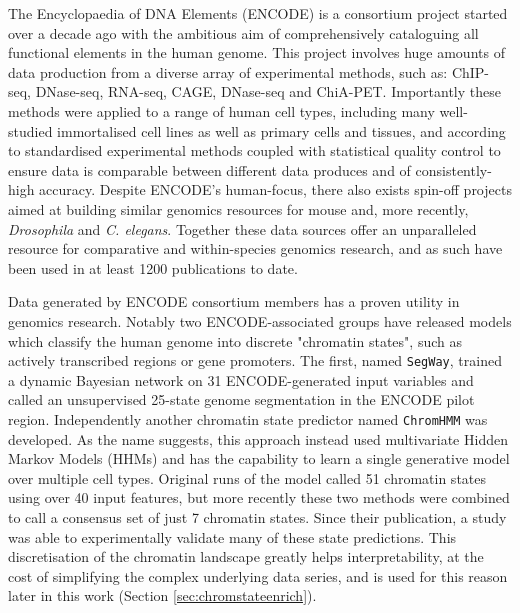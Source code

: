 \documentclass[a4paper,11pt,oneside]{book}
\begin{document}
The Encyclopaedia of DNA Elements (ENCODE) is a consortium project started over a decade ago with the ambitious aim of comprehensively cataloguing all functional elements in the human genome.\cite{Feingold2004, Qu2013, Dunham2012} This project involves huge amounts of data production from a diverse array of experimental methods, such as: ChIP-seq, DNase-seq, RNA-seq, CAGE, DNase-seq and ChiA-PET.\cite{Myers2011} Importantly these methods were applied to a range of human cell types, including many well-studied immortalised cell lines as well as primary cells and tissues, and according to standardised experimental methods\cite{Landt2012} coupled with statistical quality control\cite{Dunham2012, Boyle2014, Marinov2013} to ensure data is comparable between different data produces and of consistently-high accuracy. Despite ENCODE's human-focus, there also exists spin-off projects aimed at building similar genomics resources for mouse\cite{Yue2014} and, more recently, \emph{Drosophila} and \emph{C. elegans}.\cite{Ho2014} Together these data sources offer an unparalleled resource for comparative and within-species genomics research, and as such have been used in at least 1200 publications to date.\cite{encodenews}

Data generated by ENCODE consortium members has a proven utility in genomics research. Notably two ENCODE-associated groups have released models which classify the human genome into discrete "chromatin states", such as actively transcribed regions or gene promoters. The first, named \texttt{SegWay}, trained a dynamic Bayesian network on  31 ENCODE-generated input variables and called an unsupervised 25-state genome segmentation in the ENCODE pilot region.\cite{Hoffman2012} Independently another chromatin state predictor named \texttt{ChromHMM} was developed.\cite{Ernst2011, Ernst2012} As the name suggests, this approach instead used multivariate Hidden Markov Models (HHMs) and has the capability to learn a single generative model over multiple cell types. Original runs of the model called 51 chromatin states using over 40 input features,\cite{Ernst2010a} but more recently these two methods were combined to call a consensus set of just 7 chromatin states.\cite{Hoffman2013} Since their publication, a study was able to experimentally validate many of these state predictions.\cite{Kwasnieski2014} This discretisation of the chromatin landscape greatly helps interpretability, at the cost of simplifying the complex underlying data series, and is used for this reason later in this work (Section \ref{sec:chromstateenrich}). 
\end{document}

